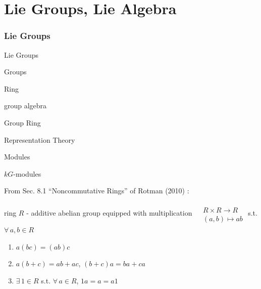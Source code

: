 \part{Lie Groups, Lie Algebra}


\section{Lie Groups}\label{dgdt:sec:lie-groups}

\begin{description}
	\item Lie Groups 
	\item Groups
	\item Ring
	\item group algebra
	\item Group Ring
	\item Representation Theory
	\item Modules
	\item $kG$-modules
\end{description}

From Sec. 8.1 ``Noncommutative Rings'' of Rotman (2010) \cite{dgdt:JRotman2010}:

\begin{definition}
	ring $R$ - additive abelian group equipped with multiplication $\begin{aligned} & \quad \\ 
	& R \times R \to R \\
	& (a,b) \mapsto ab \end{aligned}$ s.t. $\forall \, a ,b \in R$
	
	\begin{enumerate}
		\item[(i)] $a(bc) = (ab)c$ 
		\item[(ii)] $a(b+c) = ab+ ac$, $(b+c)a = ba + ca$ 
		\item[(iii)] $\exists \, 1 \in R$ s.t. $\forall \, a \in R$, $1a = a = a1$
	\end{enumerate}
\end{definition}

